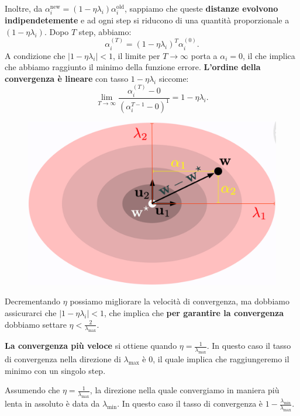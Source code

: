 Inoltre, da $\alpha^{\text{new}}_i=(1-\eta\lambda_i)\alpha^{\text{old}}_i$, sappiamo che queste \textbf{distanze evolvono indipendetemente} e ad ogni step si riducono di una quantità proporzionale a $(1-\eta\lambda_i)$. Dopo $T$ step, abbiamo:
\begin{equation}
    \alpha^{(T)}_i=(1-\eta\lambda_i)^T\alpha^{(0)}_i.
\end{equation}
A condizione che $|1-\eta\lambda_i|<1$, il limite per $T\rightarrow\infty$ porta a $\alpha_i=0$, il che implica che abbiamo raggiunto il minimo della funzione errore.
\newpage
\textbf{L'ordine della convergenza è lineare} con tasso $1-\eta\lambda_i$ siccome:
\begin{equation}
    \lim_{T\rightarrow\infty}{\frac{\alpha^{(T)}_i-0}{(\alpha^{T-1}_i-0)^1}}=1-\eta\lambda_i.
\end{equation}
\begin{figure}[h]
    \includegraphics[scale=.3]{images/best_practices/convergence.png}
    \centering
\end{figure}


Decrementando $\eta$ possiamo migliorare la velocità di convergenza, ma dobbiamo assicurarci che $|1-\eta\lambda_i|<1$, che implica che \textbf{per garantire la convergenza} dobbiamo settare $\eta<\frac{2}{\lambda_{\text{max}}}$. 


\textbf{La convergenza più veloce} si ottiene quando $\eta=\frac{1}{\lambda_{\text{max}}}$. In questo caso il tasso di convergenza nella direzione di $\lambda_{\text{max}}$ è $0$, il quale implica che raggiungeremo il minimo con un singolo step.


Assumendo che $\eta=\frac{1}{\lambda_{\text{max}}}$, la direzione nella quale convergiamo in maniera più lenta in assoluto è data da $\lambda_{\text{min}}$. In questo caso il tasso di convergenza è
$1-\frac{\lambda_{\text{min}}}{\lambda_{\text{max}}}$.


